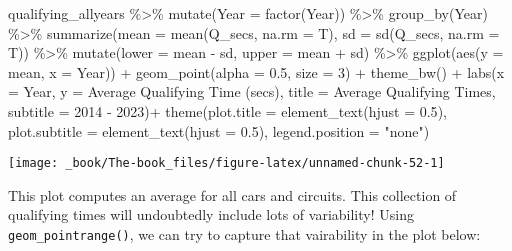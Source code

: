 \documentclass[
]{book}
\newenvironment{Shaded}{\begin{snugshade}}{\end{snugshade}}
\newcommand{\AttributeTok}[1]{\textcolor[rgb]{0.77,0.63,0.00}{#1}}
\newcommand{\DecValTok}[1]{\textcolor[rgb]{0.00,0.00,0.81}{#1}}
\newcommand{\FloatTok}[1]{\textcolor[rgb]{0.00,0.00,0.81}{#1}}
\newcommand{\FunctionTok}[1]{\textcolor[rgb]{0.00,0.00,0.00}{#1}}
\newcommand{\NormalTok}[1]{#1}
\newcommand{\SpecialCharTok}[1]{\textcolor[rgb]{0.00,0.00,0.00}{#1}}
\newcommand{\StringTok}[1]{\textcolor[rgb]{0.31,0.60,0.02}{#1}}
\begin{document}
\begin{Shaded}
\begin{Highlighting}[]
\NormalTok{qualifying\_allyears }\SpecialCharTok{\%\textgreater{}\%}
  \FunctionTok{mutate}\NormalTok{(}\AttributeTok{Year =} \FunctionTok{factor}\NormalTok{(Year)) }\SpecialCharTok{\%\textgreater{}\%}
  \FunctionTok{group\_by}\NormalTok{(Year) }\SpecialCharTok{\%\textgreater{}\%}
  \FunctionTok{summarize}\NormalTok{(}\AttributeTok{mean =} \FunctionTok{mean}\NormalTok{(Q\_secs, }\AttributeTok{na.rm =}\NormalTok{ T),}
            \AttributeTok{sd =} \FunctionTok{sd}\NormalTok{(Q\_secs, }\AttributeTok{na.rm =}\NormalTok{ T)) }\SpecialCharTok{\%\textgreater{}\%} 
  \FunctionTok{mutate}\NormalTok{(}\AttributeTok{lower =}\NormalTok{ mean  }\SpecialCharTok{{-}}\NormalTok{ sd,}
         \AttributeTok{upper =}\NormalTok{ mean }\SpecialCharTok{+}\NormalTok{ sd) }\SpecialCharTok{\%\textgreater{}\%}
  \FunctionTok{ggplot}\NormalTok{(}\FunctionTok{aes}\NormalTok{(}\AttributeTok{y =}\NormalTok{ mean, }\AttributeTok{x =}\NormalTok{ Year)) }\SpecialCharTok{+}
  \FunctionTok{geom\_point}\NormalTok{(}\AttributeTok{alpha =} \FloatTok{0.5}\NormalTok{, }\AttributeTok{size =} \DecValTok{3}\NormalTok{) }\SpecialCharTok{+}
  \FunctionTok{theme\_bw}\NormalTok{() }\SpecialCharTok{+}
  \FunctionTok{labs}\NormalTok{(}\AttributeTok{x =} \StringTok{\textquotesingle{}Year\textquotesingle{}}\NormalTok{,}
       \AttributeTok{y =} \StringTok{\textquotesingle{}Average Qualifying Time (secs)\textquotesingle{}}\NormalTok{,}
       \AttributeTok{title =} \StringTok{\textquotesingle{}Average Qualifying Times\textquotesingle{}}\NormalTok{,}
       \AttributeTok{subtitle =} \StringTok{\textquotesingle{}2014 {-} 2023\textquotesingle{}}\NormalTok{)}\SpecialCharTok{+}
  \FunctionTok{theme}\NormalTok{(}\AttributeTok{plot.title =} \FunctionTok{element\_text}\NormalTok{(}\AttributeTok{hjust =} \FloatTok{0.5}\NormalTok{),}
        \AttributeTok{plot.subtitle =} \FunctionTok{element\_text}\NormalTok{(}\AttributeTok{hjust =} \FloatTok{0.5}\NormalTok{),}
        \AttributeTok{legend.position =} \StringTok{"none"}\NormalTok{)}
\end{Highlighting}
\end{Shaded}

\begin{center}\texttt{[image: \_book/The-book\_files/figure-latex/unnamed-chunk-52-1]} \end{center}

This plot computes an average for all cars and circuits. This collection of qualifying times will undoubtedly include lots of variability! Using \texttt{geom\_pointrange()}, we can try to capture that vairability in the plot below:
\end{document}
